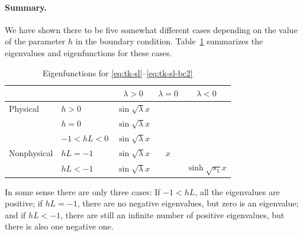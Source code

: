 \paragraph{Summary.}
We have shown there to be five somewhat different cases depending on the value of the parameter $h$ in the boundary condition.  Table~\ref{tab:tk-summary} summarizes the eigenvalues and eigenfunctions for these cases.

\begin{table}[H]
\centering
\caption{Eigenfunctions for \eqref{eq:tk-sl}--\eqref{eq:tk-sl-bc2}}
\label{tab:tk-summary}
\begin{tabular}{@{}llccc@{}}
\toprule
& & $\lambda > 0$ & $\lambda = 0$ & $\lambda < 0$ \\
\midrule
Physical & $h > 0$ & $\sin\sqrt{\lambda}x$ & & \\[6pt]
& $h = 0$ & $\sin\sqrt{\lambda}x$ & & \\[6pt]
& $-1 < hL < 0$ & $\sin\sqrt{\lambda}x$ & & \\[6pt]
Nonphysical & $hL = -1$ & $\sin\sqrt{\lambda}x$ & $x$ & \\[6pt]
& $hL < -1$ & $\sin\sqrt{\lambda}x$ & & $\sinh\sqrt{s_1}x$ \\
\bottomrule
\end{tabular}
\end{table}

In some sense there are only three cases: If $-1 < hL$, all the eigenvalues are positive; if $hL = -1$, there are no negative eigenvalues, but zero is an eigenvalue; and if $hL < -1$, there are still an infinite number of positive eigenvalues, but there is also one negative one.

